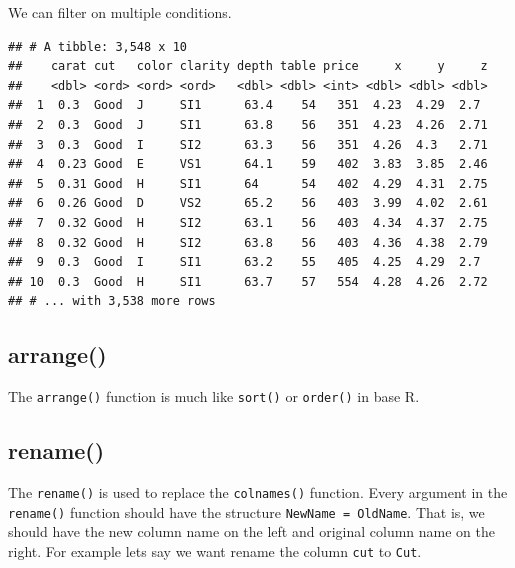 \documentclass[
]{book}
\newenvironment{Shaded}{\begin{snugshade}}{\end{snugshade}}
\newcommand{\DecValTok}[1]{\textcolor[rgb]{0.00,0.00,0.81}{#1}}
\newcommand{\KeywordTok}[1]{\textcolor[rgb]{0.13,0.29,0.53}{\textbf{#1}}}
\newcommand{\NormalTok}[1]{#1}
\newcommand{\OperatorTok}[1]{\textcolor[rgb]{0.81,0.36,0.00}{\textbf{#1}}}
\newcommand{\StringTok}[1]{\textcolor[rgb]{0.31,0.60,0.02}{#1}}
\begin{document}
We can filter on multiple conditions.

\begin{Shaded}
\end{Shaded}

\begin{verbatim}
## # A tibble: 3,548 x 10
##    carat cut   color clarity depth table price     x     y     z
##    <dbl> <ord> <ord> <ord>   <dbl> <dbl> <int> <dbl> <dbl> <dbl>
##  1  0.3  Good  J     SI1      63.4    54   351  4.23  4.29  2.7 
##  2  0.3  Good  J     SI1      63.8    56   351  4.23  4.26  2.71
##  3  0.3  Good  I     SI2      63.3    56   351  4.26  4.3   2.71
##  4  0.23 Good  E     VS1      64.1    59   402  3.83  3.85  2.46
##  5  0.31 Good  H     SI1      64      54   402  4.29  4.31  2.75
##  6  0.26 Good  D     VS2      65.2    56   403  3.99  4.02  2.61
##  7  0.32 Good  H     SI2      63.1    56   403  4.34  4.37  2.75
##  8  0.32 Good  H     SI2      63.8    56   403  4.36  4.38  2.79
##  9  0.3  Good  I     SI1      63.2    55   405  4.25  4.29  2.7 
## 10  0.3  Good  H     SI1      63.7    57   554  4.28  4.26  2.72
## # ... with 3,538 more rows
\end{verbatim}

\hypertarget{arrange}{%
\subsection{arrange()}\label{arrange}}

The \texttt{arrange()} function is much like \texttt{sort()} or \texttt{order()} in base R.

\hypertarget{rename}{%
\subsection{rename()}\label{rename}}

The \texttt{rename()} is used to replace the \texttt{colnames()} function. Every argument in the \texttt{rename()} function should have the structure \texttt{NewName\ =\ OldName}. That is, we should have the new column name on the left and original column name on the right. For example lets say we want rename the column \texttt{cut} to \texttt{Cut}.
\end{document}
